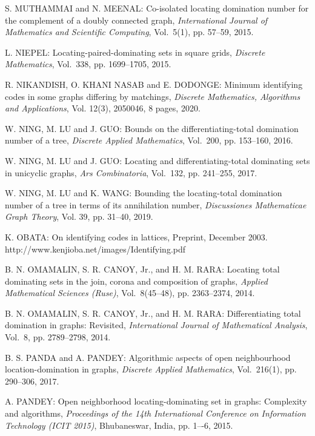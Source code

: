 \begin{thebibliography}{999}
S. MUTHAMMAI and N. MEENAL: Co-isolated locating domination number for the complement of a doubly connected graph, {\it International Journal of Mathematics and Scientific Computing}, Vol.~5(1), pp. 57--59, 2015.

L. NIEPEL: Locating-paired-dominating sets in square grids, {\it Discrete Mathematics}, Vol.~338, pp. 1699--1705, 2015.

R. NIKANDISH, O. KHANI NASAB and E. DODONGE: Minimum identifying codes in some graphs differing by matchings, {\it Discrete Mathematics, Algorithms and Applications}, Vol. 12(3), 2050046, 8 pages, 2020.

W. NING, M. LU and J. GUO: Bounds on the differentiating-total domination number of a tree, {\it Discrete Applied Mathematics}, Vol.~200, pp. 153--160, 2016.

W. NING, M. LU and J. GUO: Locating and differentiating-total dominating sets in unicyclic graphs, {\it Ars Combinatoria}, Vol.~132, pp. 241--255, 2017.

W. NING, M. LU and K. WANG: Bounding the locating-total domination number of a tree in terms of its annihilation number, {\it Discussiones Mathematicae Graph Theory}, Vol. 39, pp. 31--40, 2019.

K. OBATA: On identifying codes in lattices, Preprint, December 2003.\\ http://www.kenjioba.net/images/Identifying.pdf

B. N. OMAMALIN, S. R. CANOY, Jr., and H. M. RARA: Locating total dominating sets in the join, corona and composition of graphs, {\it Applied Mathematical Sciences (Ruse)}, Vol.~8(45--48), pp. 2363--2374, 2014.

B. N. OMAMALIN, S. R. CANOY, Jr., and H. M. RARA: Differentiating total domination in graphs: Revisited, {\it International Journal of Mathematical Analysis}, Vol.~8, pp. 2789--2798, 2014. 

B. S. PANDA and A. PANDEY: Algorithmic aspects of open neighbourhood location-domination in graphs, {\it Discrete Applied Mathematics}, Vol.~216(1), pp. 290--306, 2017.

A. PANDEY: Open neighborhood locating-dominating set in graphs: Complexity and algorithms, {\it Proceedings of the 14th International Conference on Information Technology (ICIT 2015)}, Bhubaneswar, India, pp. 1–-6, 2015.


\end{thebibliography}
